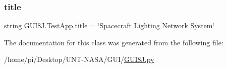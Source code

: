 \subsubsection{\texorpdfstring{title}{title}}
{\footnotesize\ttfamily string G\+U\+I8\+J.\+Test\+App.\+title = \char`\"{}Spacecraft Lighting Network System\char`\"{}\hspace{0.3cm}{\ttfamily [static]}}



The documentation for this class was generated from the following file\+:\begin{DoxyCompactItemize}
\item 
/home/pi/\+Desktop/\+U\+N\+T-\/\+N\+A\+S\+A/\+G\+U\+I/\hyperlink{GUI8J_8py}{G\+U\+I8\+J.\+py}\end{DoxyCompactItemize}
